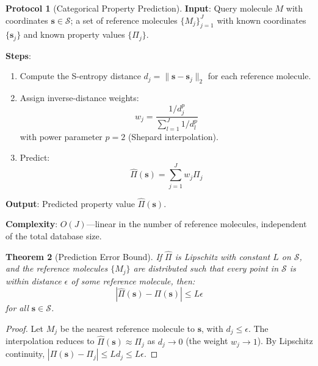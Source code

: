 \documentclass[11pt,twocolumn,a4paper]{article}
\newtheorem{theorem}{Theorem}[section]
\theoremstyle{definition}
\newtheorem{protocol}[theorem]{Protocol}
\theoremstyle{remark}
\newcommand{\Sspace}{\mathcal{S}}
\begin{document}
\begin{protocol}[Categorical Property Prediction]
\label{prot:property}
\textbf{Input}: Query molecule $M$ with coordinates $\mathbf{s} \in \Sspace$; a set of reference molecules $\{M_j\}_{j=1}^{J}$ with known coordinates $\{\mathbf{s}_j\}$ and known property values $\{\Pi_j\}$.

\textbf{Steps}:
\begin{enumerate}[nosep]
\item Compute the S-entropy distance $d_j = \|\mathbf{s} - \mathbf{s}_j\|_2$ for each reference molecule.
\item Assign inverse-distance weights:
\begin{equation}
w_j = \frac{1/d_j^p}{\sum_{l=1}^J 1/d_l^p}
\label{eq:idw_weights}
\end{equation}
with power parameter $p = 2$ (Shepard interpolation).
\item Predict:
\begin{equation}
\hat{\Pi}(\mathbf{s}) = \sum_{j=1}^{J} w_j \Pi_j
\label{eq:prediction}
\end{equation}
\end{enumerate}

\textbf{Output}: Predicted property value $\hat{\Pi}(\mathbf{s})$.

\textbf{Complexity}: $O(J)$---linear in the number of reference molecules, independent of the total database size.
\end{protocol}

\begin{theorem}[Prediction Error Bound]
\label{thm:prediction_error}
If $\hat{\Pi}$ is Lipschitz with constant $L$ on $\Sspace$, and the reference molecules $\{M_j\}$ are distributed such that every point in $\Sspace$ is within distance $\epsilon$ of some reference molecule, then:
\begin{equation}
|\hat{\Pi}(\mathbf{s}) - \Pi(\mathbf{s})| \leq L \epsilon
\label{eq:error_bound}
\end{equation}
for all $\mathbf{s} \in \Sspace$.
\end{theorem}

\begin{proof}
Let $M_j$ be the nearest reference molecule to $\mathbf{s}$, with $d_j \leq \epsilon$. The interpolation reduces to $\hat{\Pi}(\mathbf{s}) \approx \Pi_j$ as $d_j \to 0$ (the weight $w_j \to 1$). By Lipschitz continuity, $|\Pi(\mathbf{s}) - \Pi_j| \leq L d_j \leq L\epsilon$.
\end{proof}
\end{document}

